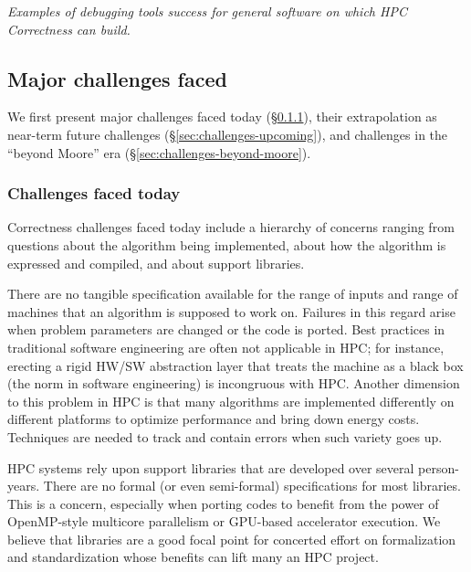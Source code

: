 {\small\em Examples of debugging tools success for general software on which HPC Correctness can build.}

\subsection{Major challenges faced}

We first present major challenges faced today (\S\ref{sec:challenges-today}), 
their extrapolation as near-term future challenges (\S\ref{sec:challenges-upcoming}), and
challenges in the
``beyond Moore'' era
(\S\ref{sec:challenges-beyond-moore}).

 \subsubsection{Challenges faced today}
 \label{sec:challenges-today}
 
 Correctness challenges faced today include a hierarchy of concerns ranging from
 questions about the algorithm being implemented, about how the 
 algorithm is expressed and compiled, and about support libraries.
 
There are no tangible
specification available for
the range of inputs and range of machines that an algorithm is supposed to work on.
%
Failures in this regard arise when problem parameters are changed or the code
is ported.
%
Best practices in traditional software engineering are often not applicable
in HPC; for instance, erecting a rigid HW/SW abstraction 
layer that
treats the machine as a black box 
(the norm in software engineering) is
incongruous with  HPC.
%
Another dimension to this problem in HPC is that many algorithms
are implemented differently on different platforms to optimize
performance and bring down energy costs.
%
Techniques are needed to track and contain errors when such
variety goes up.

HPC systems rely upon support libraries that are developed over several person-years.
%
There are no formal (or even semi-formal) specifications for most libraries.
%
This is a concern, especially when porting codes to benefit from the power of 
OpenMP-style multicore parallelism or GPU-based accelerator execution.
%
We believe that libraries are a good focal point for concerted effort on
formalization and standardization whose benefits can lift many an HPC project.


